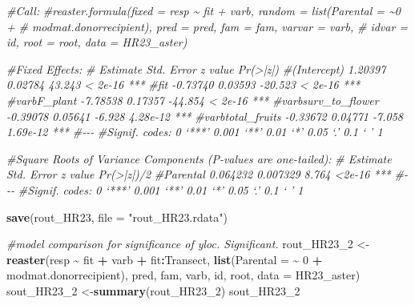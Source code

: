 \documentclass[
]{article}
\newenvironment{Shaded}{\begin{snugshade}}{\end{snugshade}}
\newcommand{\AttributeTok}[1]{\textcolor[rgb]{0.13,0.29,0.53}{#1}}
\newcommand{\CommentTok}[1]{\textcolor[rgb]{0.56,0.35,0.01}{\textit{#1}}}
\newcommand{\DecValTok}[1]{\textcolor[rgb]{0.00,0.00,0.81}{#1}}
\newcommand{\FunctionTok}[1]{\textcolor[rgb]{0.13,0.29,0.53}{\textbf{#1}}}
\newcommand{\NormalTok}[1]{#1}
\newcommand{\OtherTok}[1]{\textcolor[rgb]{0.56,0.35,0.01}{#1}}
\newcommand{\SpecialCharTok}[1]{\textcolor[rgb]{0.81,0.36,0.00}{\textbf{#1}}}
\newcommand{\StringTok}[1]{\textcolor[rgb]{0.31,0.60,0.02}{#1}}
\begin{document}
\begin{Shaded}
\begin{Highlighting}[]
\CommentTok{\#Call:}
\CommentTok{\#reaster.formula(fixed = resp \textasciitilde{} fit + varb, random = list(Parental = \textasciitilde{}0 + }
\CommentTok{\#    modmat.donorrecipient), pred = pred, fam = fam, varvar = varb, }
\CommentTok{\#    idvar = id, root = root, data = HR23\_aster)}

\CommentTok{\#Fixed Effects:}
\CommentTok{\#                   Estimate Std. Error z value Pr(\textgreater{}|z|)    }
\CommentTok{\#(Intercept)         1.20397    0.02784  43.243  \textless{} 2e{-}16 ***}
\CommentTok{\#fit                {-}0.73740    0.03593 {-}20.523  \textless{} 2e{-}16 ***}
\CommentTok{\#varbF\_plant        {-}7.78538    0.17357 {-}44.854  \textless{} 2e{-}16 ***}
\CommentTok{\#varbsurv\_to\_flower {-}0.39078    0.05641  {-}6.928 4.28e{-}12 ***}
\CommentTok{\#varbtotal\_fruits   {-}0.33672    0.04771  {-}7.058 1.69e{-}12 ***}
\CommentTok{\#{-}{-}{-}}
\CommentTok{\#Signif. codes:  0 ‘***’ 0.001 ‘**’ 0.01 ‘*’ 0.05 ‘.’ 0.1 ‘ ’ 1}

\CommentTok{\#Square Roots of Variance Components (P{-}values are one{-}tailed):}
\CommentTok{\#         Estimate Std. Error z value Pr(\textgreater{}|z|)/2    }
\CommentTok{\#Parental 0.064232   0.007329   8.764     \textless{}2e{-}16 ***}
\CommentTok{\#{-}{-}{-}}
\CommentTok{\#Signif. codes:  0 ‘***’ 0.001 ‘**’ 0.01 ‘*’ 0.05 ‘.’ 0.1 ‘ ’ 1}


\FunctionTok{save}\NormalTok{(rout\_HR23, }\AttributeTok{file =} \StringTok{"rout\_HR23.rdata"}\NormalTok{)}

\CommentTok{\#model comparison for significance of yloc. Significant.}
\NormalTok{rout\_HR23\_2 }\OtherTok{\textless{}{-}} \FunctionTok{reaster}\NormalTok{(resp }\SpecialCharTok{\textasciitilde{}}\NormalTok{ fit }\SpecialCharTok{+}\NormalTok{ varb }\SpecialCharTok{+}\NormalTok{ fit}\SpecialCharTok{:}\NormalTok{Transect, }\FunctionTok{list}\NormalTok{(}\AttributeTok{Parental =} \SpecialCharTok{\textasciitilde{}} \DecValTok{0} \SpecialCharTok{+}\NormalTok{ modmat.donorrecipient),}
\NormalTok{    pred, fam, varb, id, root, }\AttributeTok{data =}\NormalTok{ HR23\_aster)}
\NormalTok{sout\_HR23\_2 }\OtherTok{\textless{}{-}}\FunctionTok{summary}\NormalTok{(rout\_HR23\_2)}
\NormalTok{sout\_HR23\_2}
\end{Highlighting}
\end{Shaded}
\end{document}
